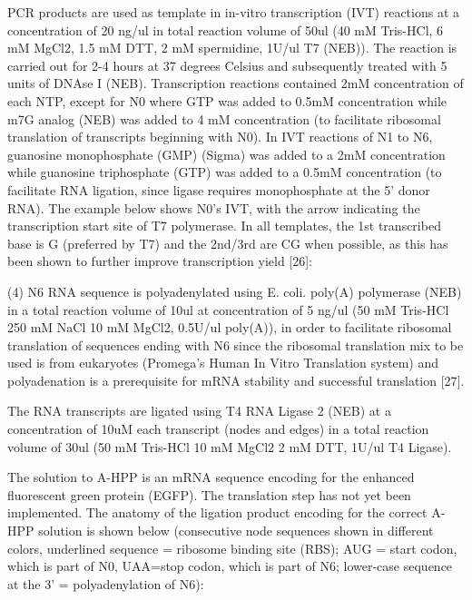 
			PCR products are used as template in in-vitro transcription (IVT) reactions at a concentration of 20 ng/ul in 
			total reaction volume of 50ul (40 mM Tris-HCl, 6 mM MgCl2, 1.5 mM DTT, 2 mM spermidine, 1U/ul T7 (NEB)). The reaction is 
			carried out for 2-4 hours at 37 degrees Celsius and subsequently treated with 5 units of DNAse I (NEB). Transcription 
			reactions contained 2mM concentration of each NTP, except for N0 where GTP was added to 0.5mM concentration while m7G 
			analog (NEB) was added to 4 mM concentration (to facilitate ribosomal translation of transcripts beginning with N0). 
			In IVT reactions of N1 to N6, guanosine monophosphate (GMP) (Sigma) was added to a 2mM concentration while guanosine 
			triphosphate (GTP) was added to a 0.5mM concentration (to facilitate RNA ligation, since ligase requires monophosphate 
			at the 5’ donor RNA). The example below shows N0’s IVT, with the arrow indicating the transcription start site of T7 polymerase. 
			In all templates, the 1st transcribed base is G (preferred by T7) and the 2nd/3rd are CG when possible, as this has been shown 
			to further improve transcription yield [26]: 
		

			(4)	N6 RNA sequence is polyadenylated using E. coli. poly(A) polymerase (NEB) in a total reaction volume of 10ul at 
			concentration of 5 ng/ul (50 mM Tris-HCl 250 mM NaCl 10 mM MgCl2, 0.5U/ul poly(A)), in order to facilitate ribosomal 
			translation of sequences ending with N6 since the ribosomal translation mix to be used is from eukaryotes (Promega’s 
			Human In Vitro Translation system) and polyadenation is a prerequisite for mRNA stability and successful translation [27]. 
			
			The RNA transcripts are ligated using T4 RNA Ligase 2 (NEB) at a concentration of 10uM each transcript (nodes and edges) 
			in a total reaction volume of 30ul (50 mM Tris-HCl 10 mM MgCl2 2 mM DTT, 1U/ul T4 Ligase). 
			
			The solution to A-HPP is an mRNA sequence encoding for the enhanced fluorescent green protein (EGFP). The translation 
			step has not yet been implemented. The anatomy of the ligation product encoding for the correct A-HPP solution is shown 
			below (consecutive node sequences shown in different colors, underlined sequence = ribosome binding site (RBS); AUG = start codon, 
			which is part of N0, UAA=stop codon, which is part of N6; lower-case sequence at the 3’ = polyadenylation of N6):

		
		
\printbibliography
